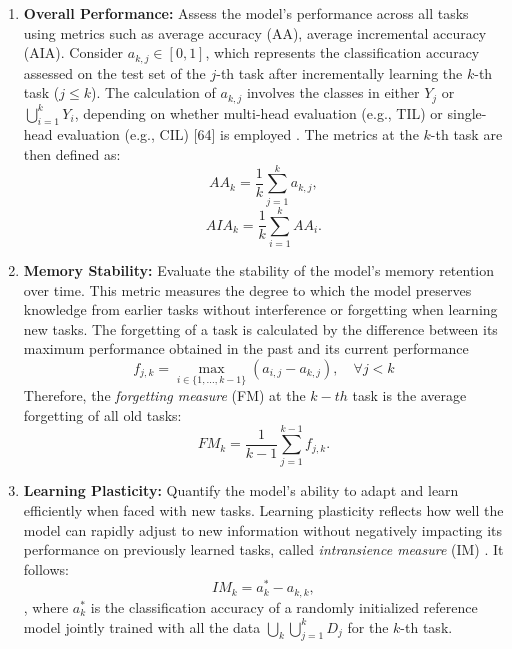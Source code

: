 \documentclass[12pt,a4paper]{article}
\begin{document}
\begin{enumerate}
	\item \textbf{Overall Performance:}
	Assess the model's performance across all tasks using metrics such as average accuracy (AA), average incremental accuracy (AIA). Consider $a_{k,j} \in [0, 1]$, which represents the classification accuracy assessed on the test set of the $j$-th task after incrementally learning the $k$-th task ($j \leq k$). The calculation of $a_{k,j}$ involves the classes in either $Y_j$ or $\bigcup_{i=1}^{k} Y_i$, depending on whether multi-head evaluation (e.g., TIL) or single-head evaluation (e.g., CIL) [64] is employed \cite{contlearning}. The metrics at the $k$-th task are then defined as:
	\begin{equation}
		AA_k = \frac{1}{k} \sum_{j=1}^{k} a_{k,j},
	\end{equation}
	\begin{equation}
		AIA_k = \frac{1}{k} \sum_{i=1}^{k} AA_i.
	\end{equation}	
	

	\item \textbf{Memory Stability:}
	Evaluate the stability of the model's memory retention over time. This metric measures the degree to which the model preserves knowledge from earlier tasks without interference or forgetting when learning new tasks. The forgetting of a task is calculated by the difference	between its maximum performance obtained in the past and its current performance \cite{contlearning}
	\begin{equation}
		f_{j,k} = \max_{i \in \{1, \ldots, k-1\}} (a_{i,j} - a_{k,j}), \quad \forall j < k
	\end{equation}
	Therefore, the \textit{forgetting measure} (FM) at the $k-th$ task is the average forgetting of all old tasks:
	\begin{equation}
		FM_k = \frac{1}{k-1} \sum_{j=1}^{k-1} f_{j,k}.
	\end{equation}
	
	\item \textbf{Learning Plasticity:}
	Quantify the model's ability to adapt and learn efficiently when faced with new tasks. Learning plasticity reflects how well the model can rapidly adjust to new information without negatively impacting its performance on previously learned tasks, called \textit{intransience measure} (IM) \cite{contlearning}. It follows:
	\begin{equation}
		IM_k = a^*_k - a_{k,k},
	\end{equation}
	, where $a^*_k$ is the classification accuracy of a randomly initialized reference model jointly trained with all the data $\bigcup_{k} \bigcup_{j=1}^{k} D_j$ for the $k$-th task.
	
\end{enumerate}
\end{document}
